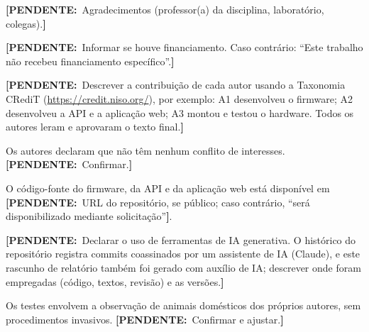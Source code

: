 \documentclass[portuguese]{sbcreviews-2025}%
\newcommand{\pendente}[1]{{\color{pendcolor}\textbf{[PENDENTE:}~#1\textbf{]}}}
\begin{document}
\begin{declarations}

\begin{acknowledgements}
\pendente{Agradecimentos (professor(a) da disciplina, laboratório, colegas).}
\end{acknowledgements}

\begin{funding}
\pendente{Informar se houve financiamento. Caso contrário: ``Este trabalho não recebeu financiamento específico''.}
\end{funding}

\begin{contributions}
\pendente{Descrever a contribuição de cada autor usando a Taxonomia CRediT (\href{https://credit.niso.org/}{https://credit.niso.org/}), por exemplo: A1 desenvolveu o firmware; A2 desenvolveu a API e a aplicação web; A3 montou e testou o hardware. Todos os autores leram e aprovaram o texto final.}
\end{contributions}

\begin{interests}
Os autores declaram que não têm nenhum conflito de interesses. \pendente{Confirmar.}
\end{interests}

\begin{materials}
O código-fonte do firmware, da API e da aplicação web está disponível em \pendente{URL do repositório, se público; caso contrário, ``será disponibilizado mediante solicitação''}.
\end{materials}

\begin{aitools}
\pendente{Declarar o uso de ferramentas de IA generativa. O histórico do repositório registra commits coassinados por um assistente de IA (Claude), e este rascunho de relatório também foi gerado com auxílio de IA; descrever onde foram empregadas (código, textos, revisão) e as versões.}
\end{aitools}

\begin{furtherinformation}
Os testes envolvem a observação de animais domésticos dos próprios autores, sem procedimentos invasivos. \pendente{Confirmar e ajustar.}
\end{furtherinformation}

\end{declarations}




\clearpage
\appendix

\end{document}
